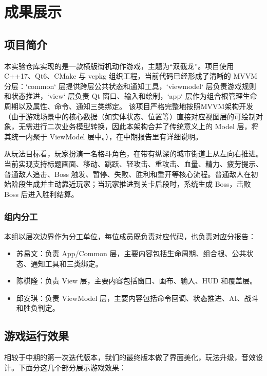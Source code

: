 \documentclass[a4paper]{article}
\begin{document}
\section{成果展示}

\subsection{项目简介}
本实验仓库实现的是一款横版街机动作游戏，主题为“双截龙”。项目使用 C++17、Qt6、CMake 与 vcpkg 组织工程，当前代码已经形成了清晰的 MVVM 分层：`common` 层提供跨层公共状态和通知工具，`viewmodel` 层负责游戏规则和状态推进，`view` 层负责 Qt 窗口、输入和绘制，`app` 层作为组合根管理生命周期以及属性、命令、通知三类绑定。
该项目严格完整地按照MVVM架构开发（由于游戏场景中的核心数据（如实体状态、位置等）直接对应视图层的可绘制对象，无需进行二次业务模型转换，因此本架构合并了传统意义上的 Model 层，将其统一内聚于 ViewModel 层中。），在中期报告里有详细说明。

从玩法目标看，玩家扮演一名格斗角色，在带有纵深的城市街道上从左向右推进。当前实现支持标题画面、移动、跳跃、轻攻击、重攻击、血量、精力、疲劳提示、普通敌人追击、Boss 触发、暂停、失败、胜利和重开等核心流程。普通敌人在初始阶段生成并主动靠近玩家；当玩家推进到关卡后段时，系统生成 Boss，击败 Boss 后进入胜利结算。
\subsubsection{组内分工}

本组以层次边界作为分工单位，每位成员既负责对应代码，也负责对应分报告：

\begin{itemize}
  \item 苏易文：负责 App/Common 层，主要内容包括生命周期、组合根、公共状态、通知工具和三类绑定。
  \item 陈棋隆：负责 View 层，主要内容包括窗口、画布、输入、HUD 和覆盖层。
  \item 邱安琪：负责 ViewModel 层，主要内容包括命令回调、状态推进、AI、战斗和胜负判定。
\end{itemize}

\subsection{游戏运行效果}
相较于中期的第一次迭代版本，我们的最终版本做了界面美化，玩法升级，音效设计。下面分这几个部分展示游戏效果：
\end{document}
